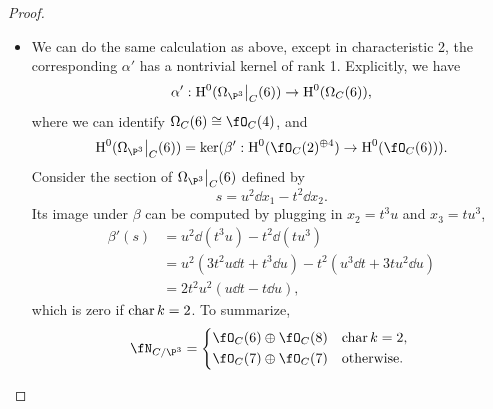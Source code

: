 \documentclass[a4paper]{article}
\begin{document}
\begin{enumerate} [label=\textbf{\arabic*.}, leftmargin=0em]
\begin{proof}
\begin{itemize} [leftmargin=0cm]
                  \item[(b)] We can do the same calculation as above, except in characteristic 2, the corresponding $\alpha'$ has a nontrivial kernel of rank 1.
                        Explicitly, we have
                        \begin{equation*}
                            \alpha' : \cH^0(\restr{\Omega_{\P^3}}{C}(6)) \to \cH^0(\Omega_C(6)),
                        \end{equation*}
                        where we can identify $\Omega_C(6) \cong \fO_C(4)$, and
                        \begin{equation*}
                            \cH^0(\restr{\Omega_{\P^3}}{C}(6)) = \ker(\beta' : \cH^0(\fO_C(2)^{\oplus 4}) \to \cH^0(\fO_C(6))).
                        \end{equation*}
                        Consider the section of $\restr{\Omega_{\P^3}}{C}(6)$ defined by
                        \begin{equation*}
                            s = u^2 \dd x_1 - t^2 \dd x_2.
                        \end{equation*}
                        Its image under $\beta$ can be computed by plugging in $x_2 = t^3 u$ and $x_3 = tu^3$,
                        \begin{align*}
                            \beta'(s) & = u^2 \dd(t^3 u) - t^2 \dd (tu^3)                               \\
                                      & = u^2(3t^2 u \dd t + t^3 \dd u) - t^2(u^3 \dd t + 3 tu^2 \dd u) \\
                                      & = 2 t^2 u^2 (u \dd t - t \dd u),
                        \end{align*}
                        which is zero if $\operatorname{char}{k} = 2$.
                        To summarize,
                        \begin{equation*}
                            \fN_{C/\P^3} = \begin{cases*}
                                \fO_C(6) \oplus \fO_C(8) & $\car{k} = 2$, \\
                                \fO_C(7) \oplus \fO_C(7) & otherwise.
                            \end{cases*}
                        \end{equation*}
              \end{itemize}
          \end{proof}

\end{enumerate}
\end{document}
